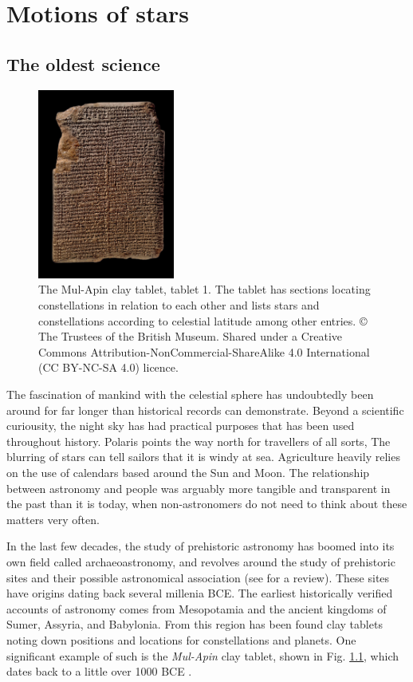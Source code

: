 \chapter{Motions of stars}\label{chap:motions}

\section{The oldest science}\label{sec:oldest}
\begin{figure}[t]
    \centering
    \includegraphics[width=0.4\textwidth]{images/tablet.jpeg}
    \caption{The Mul-Apin clay tablet, tablet 1. The tablet has sections locating constellations in relation to each other and lists stars and constellations according to celestial latitude among other entries. © The Trustees of the British Museum. Shared under a Creative Commons Attribution-NonCommercial-ShareAlike 4.0 International (CC BY-NC-SA 4.0) licence.} %
    \label{fig:tablet}
\end{figure}
The fascination of mankind with the celestial sphere has undoubtedly been around for far longer than historical records can demonstrate. Beyond a scientific curiousity, the night sky has had practical purposes that has been used throughout history. Polaris points the way north for travellers of all sorts, The blurring of stars can tell sailors that it is windy at sea. Agriculture heavily relies on the use of calendars based around the Sun and Moon. The relationship between astronomy and people was arguably more tangible and transparent in the past than it is today, when non-astronomers do not need to think about these matters very often. 

In the last few decades, the study of prehistoric astronomy has boomed into its own field called archaeoastronomy, and revolves around the study of prehistoric sites and their possible astronomical association (see \citealt{magli:20} for a review). These sites have origins dating back several millenia BCE. The earliest historically verified accounts of astronomy comes from Mesopotamia and the ancient kingdoms of Sumer, Assyria, and Babylonia. From this region has been found clay tablets noting down positions and locations for constellations and planets. One significant example of such is the \textit{Mul-Apin} clay tablet, shown in Fig. \ref{fig:tablet}, which dates back to a little over 1000 BCE \cite{dejong:07}. 

